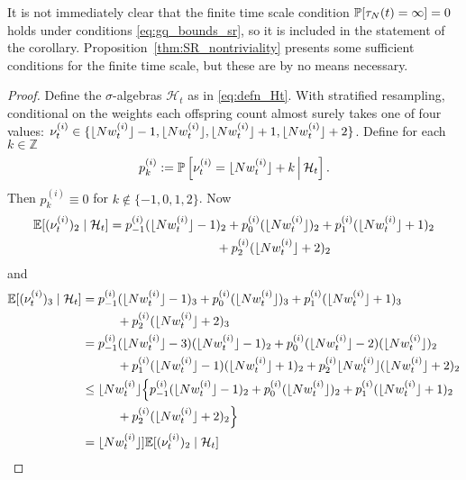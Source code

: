 It is not immediately clear that the finite time scale condition $\mathbb{P}[ \tau_N(t) = \infty] =0$ holds under conditions \eqref{eq:gq_bounds_sr}, so it is included in the statement of the corollary. Proposition~\ref{thm:SR_nontriviality} presents some sufficient conditions for the finite time scale, but these are by no means necessary.


\begin{proof}
Define the $\sigma$-algebras $\mathcal{H}_t$ as in \eqref{eq:defn_Ht}.
With stratified resampling, conditional on the weights each offspring count almost surely takes one of four values: $\nu_t^{(i)} \in \{ \lfloor N w_t^{(i)} \rfloor -1, \lfloor N w_t^{(i)} \rfloor, \lfloor N w_t^{(i)} \rfloor +1, \lfloor N w_t^{(i)} \rfloor +2 \}$.  
Define for each $k\in\mathbb{Z}$
\begin{equation}\label{eq:pk_defn}
p_k^{(i)} := \mathbb{P} \left[ \nu_t^{(i)} = \lfloor N w_t^{(i)} \rfloor + k \,\middle|\, \mathcal{H}_t \right] .
\end{equation}
Then $p_k^{(i)} \equiv 0$ for $k\notin \{-1,0,1,2\}$.
Now
\begin{align*}
\E [(\nu_t^{(i)})_2 \mid \mathcal{H}_t ]
&= p_{-1}^{(i)} (\flnw -1)_2 + p_0^{(i)} (\flnw)_2 + p_1^{(i)} (\flnw +1)_2 \\
    &\hspace{3cm} + p_2^{(i)} (\flnw +2)_2
\end{align*}
and
\begin{align}
\E [(\nu_t^{(i)})_3 \mid \mathcal{H}_t ]
&= p_{-1}^{(i)} (\flnw -1)_3 + p_0^{(i)} (\flnw)_3 + p_1^{(i)} (\flnw +1)_3 \notag\\
    &\hspace{1cm} + p_2^{(i)} (\flnw +2)_3 \notag\\
&= p_{-1}^{(i)} (\flnw -3)(\flnw -1)_2 + p_0^{(i)} (\flnw -2)(\flnw)_2 \notag\\
     &\hspace{1cm} + p_1^{(i)} (\flnw -1)(\flnw +1)_2 
         + p_2^{(i)} \flnw (\flnw +2)_2 \notag\\
&\leq \flnw \Big\{ p_{-1}^{(i)} (\flnw -1)_2 + p_0^{(i)} (\flnw)_2 
        + p_1^{(i)} (\flnw +1)_2 \notag\\
    &\hspace{1cm} + p_2^{(i)} (\flnw +2)_2 \Big\} \notag\\
&= \flnw ]\E [(\nu_t^{(i)})_2 \mid \mathcal{H}_t ] \notag\\

\end{align}
\end{proof}
